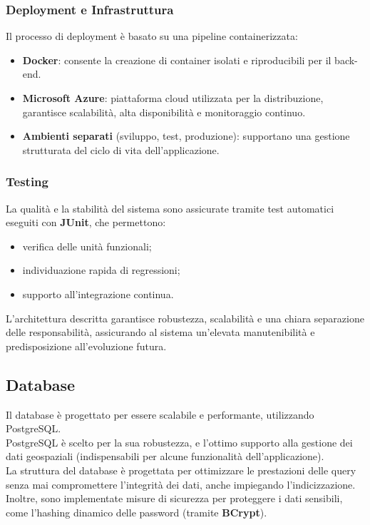 \documentclass{book}
\begin{document}
\subsubsection{Deployment e Infrastruttura}
Il processo di deployment è basato su una pipeline containerizzata:
\begin{itemize}
    \item \textbf{Docker}: consente la creazione di container isolati e riproducibili per il back-end.
    \item \textbf{Microsoft Azure}: piattaforma cloud utilizzata per la distribuzione, garantisce scalabilità, alta disponibilità e monitoraggio continuo.
    \item \textbf{Ambienti separati} (sviluppo, test, produzione): supportano una gestione strutturata del ciclo di vita dell’applicazione.
\end{itemize}

\subsubsection{Testing}
La qualità e la stabilità del sistema sono assicurate tramite test automatici eseguiti con \textbf{JUnit}, che permettono:
\begin{itemize}
    \item verifica delle unità funzionali;
    \item individuazione rapida di regressioni;
    \item supporto all’integrazione continua.
\end{itemize}

L’architettura descritta garantisce robustezza, scalabilità e una chiara separazione delle responsabilità, assicurando al sistema un’elevata manutenibilità e predisposizione all’evoluzione futura.

\subsection{Database}
Il database è progettato per essere scalabile e performante, utilizzando PostgreSQL.\\
PostgreSQL è scelto per la sua robustezza, e l'ottimo supporto alla gestione dei dati geospaziali (indispensabili per alcune funzionalità dell'applicazione).\\
La struttura del database è progettata per ottimizzare le prestazioni delle query senza mai compromettere l'integrità dei dati, anche impiegando l'indicizzazione.\\
Inoltre, sono implementate misure di sicurezza per proteggere i dati sensibili, come l'hashing dinamico delle password (tramite \textbf{BCrypt}).
\end{document}

